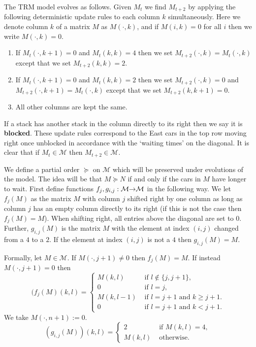\documentclass[reqno]{amsart}
\begin{document}
The TRM model evolves as follows. Given $M_t$ we find $M_{t+2}$ by applying the following deterministic update rules to each column $k$ simultaneously. Here we denote column $k$ of a matrix $M$ as $M(\cdot,k)$, and if $M(i,k)=0$ for all $i$ then we write $M(\cdot,k)=0$.

\begin{enumerate}
    \item If $M_t(\cdot, k+1) = 0$ and $M_t(k,k) = 4$ then we set $M_{t+2}(\cdot, k) = M_t(\cdot, k)$ except that we set $M_{t+2}(k,k) = 2$.
    \item If $M_t(\cdot, k+1) = 0$ and $M_t(k,k) = 2$ then we set $M_{t+2}(\cdot, k)=0$ and $M_{t+2}(\cdot, k+1) = M_t(\cdot, k)$ except that we set $M_{t+2}(k,k+1)=0$.
    \item All other columns are kept the same.
\end{enumerate}
If a stack has another stack in the column directly to its right then we say it is \textbf{blocked}. These update rules correspond to the East cars in the top row moving right once unblocked in accordance with the `waiting times' on the diagonal. It is clear that if $M_t \in \mathcal{M}$ then $M_{t+2} \in \mathcal{M}$. 

We define a partial order $\succeq$ on $\mathcal{M}$ which will be preserved under evolutions of the model. The idea will be that $M \succeq N$ if and only if the cars in $M$ have longer to wait.  First define functions $f_j,g_{i,j} : \mathcal{M} \mathord{\rightarrow} \mathcal{M}$ in the following way. We let $f_j(M)$ as the matrix $M$ with column $j$ shifted right by one column as long as column $j$ has an empty column directly to its right (if this is not the case then $f_j(M) = M$). When shifting right, all entries above the diagonal are set to $0$.
Further, $g_{i,j}(M)$ is the matrix $M$ with the element at index $(i,j)$ changed from a $4$ to a $2$. If the element at index $(i,j)$ is not a $4$ then $g_{i,j}(M)=M$.

Formally, let $M \in \mathcal{M}$. If $M(\cdot, j+1) \neq 0$ then $f_j(M) = M$. If instead $M(\cdot, j+1) = 0$ then
\begin{equation*}
        (f_j(M)(k,l) =  \begin{cases}
             M(k,l) & \text{ if } l \notin \{j,j+1\}, \\
             0 & \text{ if } l=j, \\
             M(k,l-1) & \text{ if } l=j+1 \text{ and } k \geq j+1. \\
             0 & \text{ if } l=j+1 \text{ and } k < j+1.
        \end{cases}
\end{equation*}
We take $M(\cdot, n+1) := 0$.
\begin{equation*}
    (g_{i,j}(M))(k,l) = \begin{cases}
        2 & \text{ if } M(k,l) = 4, \\
        M(k,l) & \text{ otherwise}.
    \end{cases}
\end{equation*}
\end{document}
